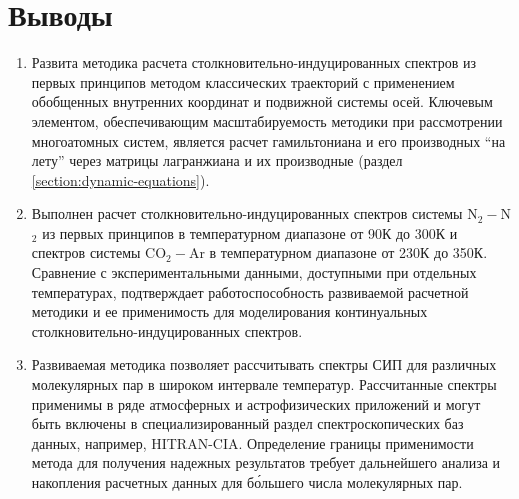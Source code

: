 \section*{Выводы}
\begin{enumerate}
    \item Развита методика расчета столкновительно-индуцированных спектров из первых принципов методом классических траекторий с применением обобщенных внутренних координат и подвижной системы осей. Ключевым элементом, обеспечивающим масштабируемость методики при рассмотрении многоатомных систем, является расчет гамильтониана и его производных \enquote{на лету} через матрицы лагранжиана и их производные (раздел \ref{section:dynamic-equations}).
    \item Выполнен расчет столкновительно-индуцированных спектров системы N$_2-$N$_2$ из первых принципов в температурном диапазоне от 90К до 300К  и спектров системы CO$_2-$Ar в температурном диапазоне от 230К до 350К. Сравнение с экспериментальными данными, доступными при отдельных температурах, подтверждает работоспособность развиваемой расчетной методики и ее применимость для моделирования континуальных столкновительно-индуцированных спектров.
    \item Развиваемая методика позволяет рассчитывать спектры СИП для различных молекулярных пар в широком интервале температур. Рассчитанные спектры применимы в  ряде атмосферных и астрофизических приложений и могут быть включены в специализированный раздел спектроскопических баз данных, например, HITRAN-CIA. Определение границы применимости метода для получения надежных результатов требует дальнейшего анализа и накопления расчетных данных для б\'{о}льшего числа молекулярных пар.  
\end{enumerate}

\iffalse
Из проделанной работы были сделаны следующие выводы
\begin{enumerate}
    \item Построена методика расчета столкновительно-индуцированных спектров методом классических траекторий. При помощи развитой методики проведены расчеты спектров систем He$-$Ar, CO$_2-$Ar и N$_2-$N$_2$, которые находятся в хорошем согласии с экспериментальными и теоретическими данными.
\end{enumerate}
\fi
